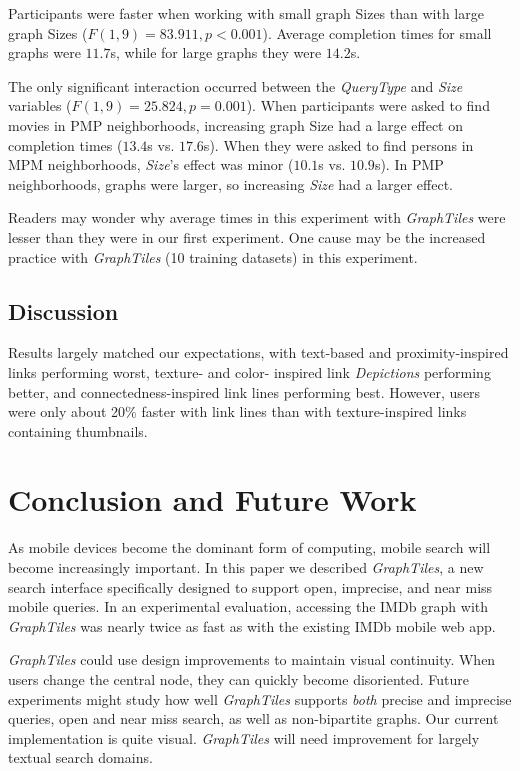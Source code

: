 \documentclass{sigchi}
\begin{document}
Participants were faster when working with small graph Sizes than with large graph Sizes ($F(1,9)=83.911, p<0.001$). Average completion times for small graphs were $11.7$s, while for large graphs they were $14.2$s.

The only significant interaction occurred between the \textit{QueryType} and \textit{Size} variables ($F(1,9)=25.824, p=0.001$). When participants were asked to find movies in PMP neighborhoods, increasing graph Size had a large effect on completion times ($13.4$s vs. $17.6$s). When they were asked to find persons in MPM neighborhoods, \textit{Size}'s effect was minor ($10.1$s vs. $10.9$s). In PMP neighborhoods, graphs were larger, so increasing \textit{Size} had a larger effect.

Readers may wonder why average times in this experiment with \textit{GraphTiles} were lesser than they were in our first experiment. One cause may be the increased practice with \textit{GraphTiles} (10 training datasets) in this experiment.


\subsection{Discussion}
Results largely matched our expectations, with text-based and proximity-inspired links performing worst, texture- and color- inspired link \textit{Depictions} performing better, and connectedness-inspired link lines performing best. However, users were only about 20\% faster with link lines than with texture-inspired links containing thumbnails.



\section{Conclusion and Future Work}

As mobile devices become the dominant form of computing, mobile search will become increasingly important. In this paper we described \textit{GraphTiles}, a new search interface specifically designed to support open, imprecise, and near miss mobile queries. In an experimental evaluation, accessing the IMDb graph with \textit{GraphTiles} was nearly twice as fast as with the existing IMDb mobile web app.

\textit{GraphTiles} could use design improvements to maintain visual continuity. When users change the central node, they can quickly become disoriented. Future experiments might study how well \textit{GraphTiles} supports \textit{both} precise and imprecise queries, open and near miss search, as well as non-bipartite graphs. Our current implementation is quite visual. \textit{GraphTiles} will need improvement for largely textual search domains. 
\end{document}
